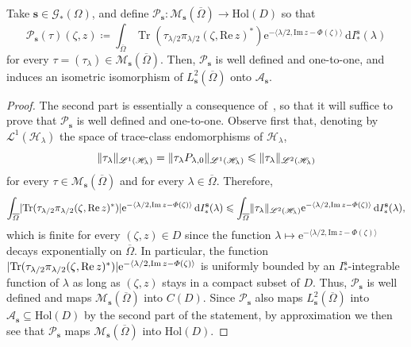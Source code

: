 \documentclass[10.5pt,reqno]{amsart}
\DeclareMathOperator{\tr}{Tr}
\newcommand{\Hol}{\mathrm{Hol}}
\newcommand{\ee}{\mathrm{e}}
\newcommand{\vect}[1]{\mathbf{{#1}}}
\newcommand{\dd}{\mathrm{d}}
\DeclarePairedDelimiter{\abs}{\lvert}{\rvert}
\DeclarePairedDelimiter{\norm}{\lVert}{\rVert}
\newcommand{\Ms}{\mathscr{M}}
\newcommand{\Hs}{\mathscr{H}}
\newcommand{\Ac}{\mathcal{A}}
\newcommand{\Gc}{\mathcal{G}}
\newcommand{\Pc}{\mathcal{P}}
\renewcommand{\Im}{\mathrm{Im}\,}
\renewcommand{\Re}{\mathrm{Re}\,}
\newcommand{\meg}{\leqslant}
\newcommand{\Lin}{\mathscr{L}}
\begin{document}
\begin{prop}\label{prop:1b}
	Take $\vect s\in \Gc_*(\Omega)$, and define $\Pc_{\vect s}\colon \Ms_{\vect s}(\overline \Omega)\to \Hol(D)$ so that
	\[
	\Pc_{\vect s}(\tau)(\zeta,z) \coloneqq \int_{\overline \Omega} \tr(\tau_{\lambda/2} \pi_{\lambda/2}(\zeta,\Re z)^*) \ee^{-\langle \lambda/2, \Im z-\Phi(\zeta)\rangle}\,\dd I_*^{\vect s}(\lambda)
	\]
	for every $\tau=(\tau_\lambda)\in \Ms_{\vect s}(\overline \Omega)$. Then, $\Pc_{\vect s}$ is well defined and one-to-one, and  induces an isometric isomorphism of $L^2_{\vect s}(\overline \Omega)$ onto $\Ac_{\vect s}$.
\end{prop}

\begin{proof}
	The second part is essentially a consequence of~\cite[Proposition 3.6 and Theorem 4.10]{Ishi4}, so that it will suffice to prove that $\Pc_{\vect s}$ is well defined and one-to-one. 
	Observe first that, denoting by $\Lin^1(\Hs_\lambda)$ the space of trace-class endomorphisms of $\Hs_\lambda$,
	\[
	\norm{\tau_\lambda}_{\Lin^1(\Hs_\lambda)}=\norm{\tau_\lambda P_{\lambda,0}}_{\Lin^1(\Hs_\lambda)}\meg \norm{\tau_\lambda}_{\Lin^2(\Hs_\lambda)}
	\]
	for every $\tau\in \Ms_{\vect s}(\overline{\Omega})$ and for  every $\lambda\in \overline{\Omega}$.
	Therefore,
	\[
	\int_{\overline \Omega} \abs{\tr(\tau_{\lambda/2} \pi_{\lambda/2}(\zeta,\Re z)^*) }\ee^{-\langle \lambda/2, \Im z-\Phi(\zeta)\rangle}\,\dd I_*^{\vect s}(\lambda)\meg \int_{\overline \Omega} \norm{\tau_\lambda}_{\Lin^2(\Hs_\lambda)} \ee^{-\langle \lambda/2, \Im z-\Phi(\zeta)\rangle}\,\dd I_*^{\vect s}(\lambda),
	\]
	which is finite for every $(\zeta,z)\in D$ since the function $\lambda \mapsto\ee^{-\langle \lambda/2, \Im z-\Phi(\zeta)\rangle}$ decays exponentially on $\overline \Omega$. In particular, the function $\abs{\tr(\tau_{\lambda/2} \pi_{\lambda/2}(\zeta,\Re z)^*) }\ee^{-\langle \lambda/2, \Im z-\Phi(\zeta)\rangle} $ is uniformly bounded by an $I^{\vect s}_*$-integrable function of $\lambda$ as long as $(\zeta,z)$ stays in a compact subset of $D$. Thus, $\Pc_{\vect s}$ is well defined and maps $\Ms_{\vect s}(\overline \Omega)$ into $C(D)$. Since $\Pc_{\vect s}$ also maps $L^2_{\vect s}(\overline \Omega)$ into $\Ac_{\vect s}\subseteq \Hol(D)$ by the second part of the statement, by approximation we then see that $\Pc_{\vect s}$ maps $\Ms_{\vect s}(\overline \Omega)$ into $\Hol(D)$.
	

\end{proof}
\end{document}
